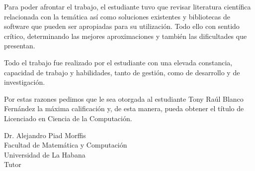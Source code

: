 \begin{opinion}
Para poder afrontar el trabajo, el estudiante tuvo que revisar literatura científica relacionada con la temática así como soluciones existentes y bibliotecas de software que pueden ser apropiadas para su utilización. Todo ello con sentido crítico, determinando las mejores aproximaciones y también las dificultades que presentan.

Todo el trabajo fue realizado por el estudiante con una elevada constancia, capacidad de trabajo y habilidades, tanto de gestión, como de desarrollo y de investigación.

Por estas razones pedimos que le sea otorgada al estudiante Tony Raúl Blanco Fernández la máxima calificación y, de esta manera, pueda obtener el título de Licenciado en Ciencia de la Computación.

\vspace{1cm}

\begin{center}
    Dr. Alejandro Piad Morffis\\
    Facultad de Matemática y Computación\\
    Universidad de La Habana\\
    Tutor\\
\end{center}


\end{opinion}

